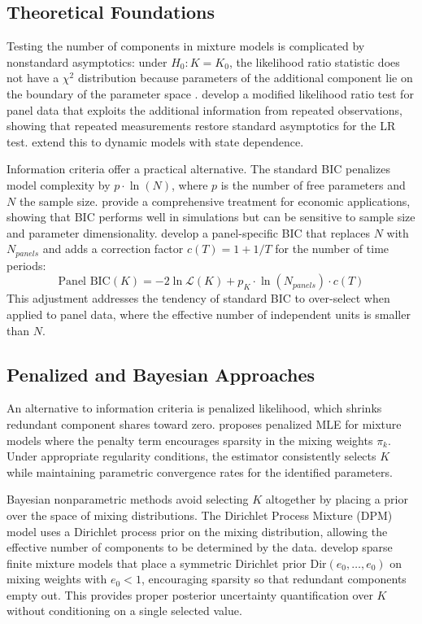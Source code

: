 \documentclass[12pt]{article}
\begin{document}
\subsection{Theoretical Foundations}

Testing the number of components in mixture models is complicated by nonstandard asymptotics: under $H_0: K = K_0$, the likelihood ratio statistic does not have a $\chi^2$ distribution because parameters of the additional component lie on the boundary of the parameter space \citep{chen2001, chen2009}. \citet{kasahara2009} develop a modified likelihood ratio test for panel data that exploits the additional information from repeated observations, showing that repeated measurements restore standard asymptotics for the LR test. \citet{kasahara2014} extend this to dynamic models with state dependence.

Information criteria offer a practical alternative. The standard BIC \citep{schwarz1978} penalizes model complexity by $p \cdot \ln(N)$, where $p$ is the number of free parameters and $N$ the sample size. \citet{compiani2016} provide a comprehensive treatment for economic applications, showing that BIC performs well in simulations but can be sensitive to sample size and parameter dimensionality. \citet{hao2025} develop a panel-specific BIC that replaces $N$ with $N_{panels}$ and adds a correction factor $c(T) = 1 + 1/T$ for the number of time periods:
\begin{equation}
\text{Panel BIC}(K) = -2\ln\mathcal{L}(K) + p_K \cdot \ln(N_{panels}) \cdot c(T)
\label{eq:panelbic}
\end{equation}
This adjustment addresses the tendency of standard BIC to over-select when applied to panel data, where the effective number of independent units is smaller than $N$.

\subsection{Penalized and Bayesian Approaches}

An alternative to information criteria is penalized likelihood, which shrinks redundant component shares toward zero. \citet{budanova2025} proposes penalized MLE for mixture models where the penalty term encourages sparsity in the mixing weights $\pi_k$. Under appropriate regularity conditions, the estimator consistently selects $K$ while maintaining parametric convergence rates for the identified parameters.

Bayesian nonparametric methods avoid selecting $K$ altogether by placing a prior over the space of mixing distributions. The Dirichlet Process Mixture (DPM) model \citep{ferguson1973, antoniak1974} uses a Dirichlet process prior on the mixing distribution, allowing the effective number of components to be determined by the data. \citet{malsiner2016} develop sparse finite mixture models that place a symmetric Dirichlet prior $\text{Dir}(e_0, \ldots, e_0)$ on mixing weights with $e_0 < 1$, encouraging sparsity so that redundant components empty out. This provides proper posterior uncertainty quantification over $K$ without conditioning on a single selected value.
\end{document}
